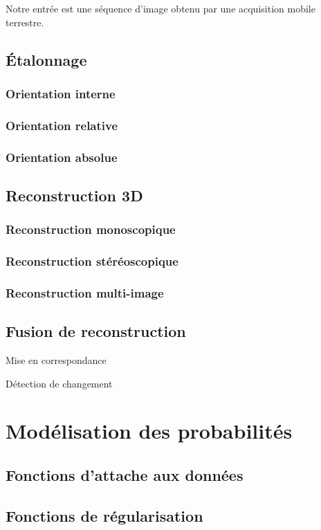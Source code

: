 \documentclass[../main/These_Mathias_Paget.tex]{subfiles}
\begin{document}
Notre entrée est une séquence d'image obtenu par une acquisition mobile terrestre.





\subsection{Étalonnage}

\subsubsection{Orientation interne}

\subsubsection{Orientation relative}

\subsubsection{Orientation absolue}

\subsection{Reconstruction 3D}

\subsubsection{Reconstruction monoscopique}

\subsubsection{Reconstruction stéréoscopique}

\subsubsection{Reconstruction multi-image}

\subsection{Fusion de reconstruction}

Mise en correspondance

Détection de changement

\section{Modélisation des probabilités}

\subsection{Fonctions d'attache aux données}

\subsection{Fonctions de régularisation}

%




\end{document}
